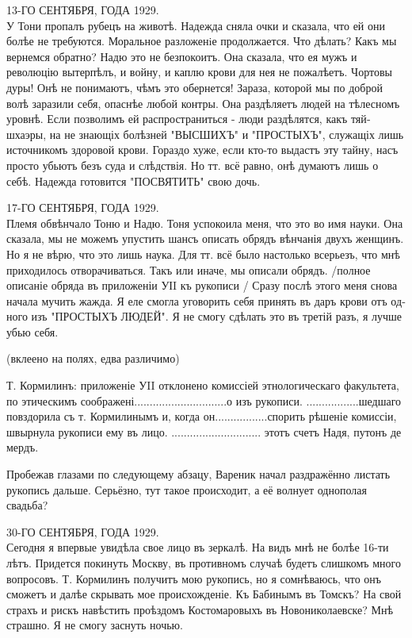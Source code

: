 \documentclass[a5paper,12pt,fleqn]{extbook}\usepackage{cooltooltips}\usepackage{polyglossia}\setdefaultlanguage[babelshorthands=true]{russian}\setotherlanguage{english}\defaultfontfeatures{Ligatures=TeX,Mapping=tex-text} \usepackage{xcolor}\definecolor{lightgray}{HTML}{bbbbbb}\color{lightgray}\newcommand{\ml}[3]{\textenglish{\textcolor{black}{#3}}}
\newcommand{\oldtyping}[1]{{\hspace{0.1em}\oldfont\small{#1}\par}\hspace{0.1em}}
\begin{document}
\oldtyping{
13-ГО СЕНТЯБРЯ, ГОДА 1929.\\
У Тони пропалъ рубецъ на животѣ.
Надежда сняла очки и сказала, что ей они болѣе не требуются.
Моральное разложенiе продолжается.
Что дѣлать?
Какъ мы вернемся обратно?
Надю это не безпокоитъ.
Она сказала, что ея мужъ и революцію вытерпѣлъ, и войну, и каплю крови для нея не пожалѣетъ.
Чортовы дуры!
Онѣ не понимаютъ, чѣмъ это обернется!
Зараза, которой мы по доброй волѣ заразили себя, опаснѣе любой контры.
Она раздѣляетъ людей на тѣлесномъ уровнѣ.
Если позволимъ ей распространиться - люди раздѣлятся, какъ тяйшхаэры, на не знающіх болѣзней "ВЫСШИХЪ" и "ПРОСТЫХЪ", служащіх лишь источникомъ здоровой крови.
Гораздо хуже, если кто-то выдастъ эту тайну, насъ просто убьютъ безъ суда и слѣдствія.
Но тт. всё равно, онѣ думаютъ лишь о себѣ.
Надежда готовится "ПОСВЯТИТЬ" свою дочь.
}

\oldtyping{
17-ГО СЕНТЯБРЯ, ГОДА 1929.\\
Племя обвѣнчало Тоню и Надю.
Тоня успокоила меня, что это во имя науки.
Она сказала, мы не можемъ упустить шансъ описать обрядъ вѣнчанія двухъ женщинъ.
Но я не вѣрю, что это лишь наука.
Для ​тт​. ​всё​ было настолько всерьезъ, что мнѣ приходилось отворачиваться.
Такъ или иначе, мы описали обрядъ.
/полное описаніе обряда въ приложеніи ​УІI къ рукописи /
Сразу послѣ этого меня снова начала мучить жажда.
Я еле смогла уговорить себя принять въ даръ крови отъ одного изъ "ПРОСТЫХЪ ЛЮДЕЙ".
Я не смогу сдѣлать это въ третій разъ, я лучше убью себя.
}

(вклеено на полях, едва различимо)

\oldtyping{
Т. ​Кормилинъ​: приложеніе ​УII​ отклонено комиссіей этнологическаго факультета, по этическимъ соображені..............................о изъ рукописи.
.................шедшаго повздорила съ т. ​Кормилинымъ​ и, когда он.................спорить рѣшеніе комиссіи, швырнула рукописи ему въ лицо.
............................. этотъ счетъ Надя, ​путонъ​ ​де мердъ​.
}

Пробежав глазами по следующему абзацу, Вареник начал раздражённо листать рукопись дальше.
Серьёзно, тут такое происходит, а её волнует однополая свадьба?

\oldtyping{
30-ГО СЕНТЯБРЯ, ГОДА 1929.\\
Сегодня я впервые увидѣла свое лицо въ зеркалѣ.
На видъ мнѣ не болѣе 16-ти лѣтъ.
Придется покинуть Москву, въ противномъ случаѣ будетъ слишкомъ много вопросовъ.
Т. Кормилинъ получитъ мою рукопись, но я сомнѣваюсь, что онъ сможетъ и далѣе скрывать мое происхожденіе.
Къ Бабинымъ въ Томскъ?
На свой страхъ и рискъ навѣстить проѣздомъ Костомаровыхъ въ Новониколаевске?
Мнѣ страшно.
Я не смогу заснуть ночью.
}
\end{document}
